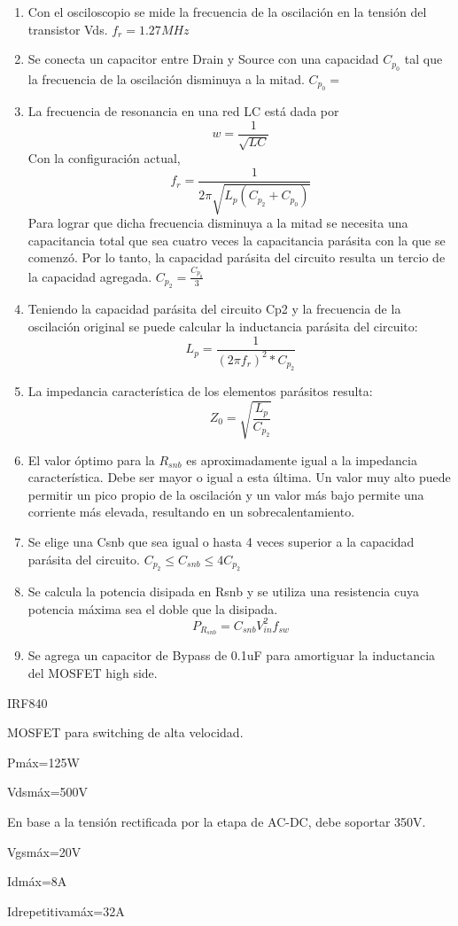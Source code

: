 \begin{enumerate}
    \item Con el osciloscopio se mide la frecuencia de la oscilación en la tensión del transistor Vds. $f_{r}=1.27MHz$ %
    \item Se conecta un capacitor entre Drain y Source con una capacidad $C_{p_{0}}$ tal que la frecuencia de la oscilación disminuya a la mitad. $C_{p_{0}}=$
    \item La frecuencia de resonancia en una red LC está dada por
    $$ w=\frac{1}{\sqrt{LC}} $$
    Con la configuración actual, 
    $$ f_{r}=\frac{1}{2\pi\sqrt{L_{p}(C_{p_{2}}+C_{p_{0}})}} $$
    Para lograr que dicha frecuencia disminuya a la mitad se necesita una capacitancia total que sea cuatro veces la capacitancia parásita con la que se comenzó.
    Por lo tanto, la capacidad parásita del circuito resulta un tercio de la capacidad agregada. $C_{p_{2}} = \frac{C_{p_{0}}}{3}$
    \item Teniendo la capacidad parásita del circuito Cp2 y la frecuencia de la oscilación original se puede calcular la inductancia parásita del circuito:
    $$ L_{p}=\frac{1}{(2\pi f_{r})^{2}*C_{p_{2}}} $$
    \item La impedancia característica de los elementos parásitos resulta:
    $$ Z_{0}=\sqrt{\frac{L_p}{C_{p_2}}} $$
    \item El valor óptimo para la $R_{snb}$ es aproximadamente igual a la impedancia característica. Debe ser mayor o igual a esta última. Un valor muy alto puede permitir un pico propio de la oscilación y un valor más bajo permite una corriente más elevada, resultando en un sobrecalentamiento.
    \item Se elige una Csnb que sea igual o hasta 4 veces superior a la capacidad parásita del circuito. $C_{p_2}\leq C_{snb}\leq 4C_{p_2}$
    \item Se calcula la potencia disipada en Rsnb y se utiliza una resistencia cuya potencia máxima sea el doble que la disipada.
    $$ P_{R_{snb}}=C_{snb}V_{in}^2f_{sw} $$
    \item Se agrega un capacitor de Bypass de 0.1uF para amortiguar la inductancia del MOSFET high side.     
\end{enumerate}

IRF840

MOSFET para switching de alta velocidad. 

Pmáx=125W

Vdsmáx=500V

En base a la tensión rectificada por la etapa de AC-DC, debe soportar 350V. 

Vgsmáx=20V
 
Idmáx=8A

Idrepetitivamáx=32A


